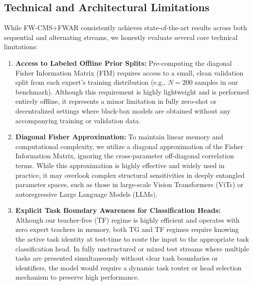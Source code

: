 \documentclass{article}
\begin{document}
\subsection{Technical and Architectural Limitations}
While FW-CMS+FWAR consistently achieves state-of-the-art results across both sequential and alternating streams, we honestly evaluate several core technical limitations:
\begin{enumerate}
    \item \textbf{Access to Labeled Offline Prior Splits:} Pre-computing the diagonal Fisher Information Matrix (FIM) requires access to a small, clean validation split from each expert's training distribution (e.g., $N=200$ samples in our benchmark). Although this requirement is highly lightweight and is performed entirely offline, it represents a minor limitation in fully zero-shot or decentralized settings where black-box models are obtained without any accompanying training or validation data.
    \item \textbf{Diagonal Fisher Approximation:} To maintain linear memory and computational complexity, we utilize a diagonal approximation of the Fisher Information Matrix, ignoring the cross-parameter off-diagonal correlation terms. While this approximation is highly effective and widely used in practice, it may overlook complex structural sensitivities in deeply entangled parameter spaces, such as those in large-scale Vision Transformers (ViTs) or autoregressive Large Language Models (LLMs).
    \item \textbf{Explicit Task Boundary Awareness for Classification Heads:} Although our teacher-free (TF) regime is highly efficient and operates with zero expert teachers in memory, both TG and TF regimes require knowing the active task identity at test-time to route the input to the appropriate task classification head. In fully unstructured or mixed test streams where multiple tasks are presented simultaneously without clear task boundaries or identifiers, the model would require a dynamic task router or head selection mechanism to preserve high performance.
\end{enumerate}
\end{document}
